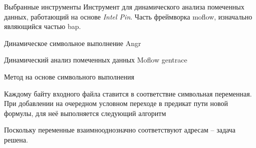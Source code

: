 \documentclass[10pt]{beamer}
\begin{document}
\begin{frame}{Выбранные инструменты}
    Инструмент для динамического анализа помеченных данных, работающий на основе \emph{Intel Pin}.
    Часть фреймворка moflow, изначально являющийся частью bap.
    \begin{block}{Динамическое символьное выполнение}
      Angr
    \end{block}
    \begin{block}{Динамический анализ помеченных данных}
        Moflow gentrace
    \end{block}
\end{frame}


\begin{frame}{Метод на основе символьного выполнения}

Каждому байту входного файла ставится в соответствие символьная переменная.
При добавлении на очередном условном переходе в предикат пути новой формулы, для неё выполняется следующий алгоритм

\begin{algorithm}[H]
\SetAlgoLined
{}
  \caption{Метод на основе символьного выполнения}
\end{algorithm}
Поскольку переменные взаимнооднозначно соответствуют адресам -- задача решена.
\end{frame}


\end{document}
